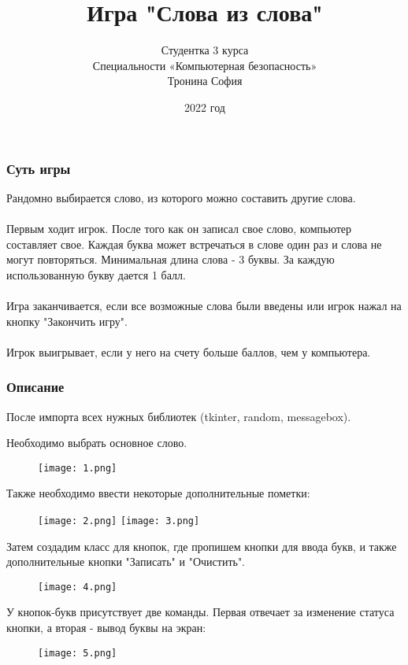 \documentclass[10pt,pdf,hyperref={unicode}]{beamer}
\title{Игра "Слова из слова"}
\author{Студентка 3 курса\\Специальности «Компьютерная безопасность»\\Тронина София}
\date{2022 год}
\newcommand{\jj}{\righthyphenmin=20 \justifying}
\begin{document}
	
	\begin{frame}
		\titlepage
	\end{frame} 
	
   	\begin{frame}
		\frametitle{Суть игры}
		\jj
		Рандомно выбирается слово, из которого можно составить другие слова. \\
		~\\Первым ходит игрок. После того как он записал свое слово, компьютер составляет свое. Каждая буква может встречаться в слове один раз и слова не могут повторяться. Минимальная длина слова - 3 буквы. За каждую использованную букву дается 1 балл. \\
		~\\Игра заканчивается, если все возможные слова были введены или игрок нажал на кнопку "Закончить игру". \\
		~\\Игрок выигрывает, если у него на счету больше баллов, чем у компьютера.
	\end{frame}

	\begin{frame}
		\frametitle{Описание}
		\jj
		После импорта всех нужных библиотек (tkinter, random, messagebox). 
		
		Необходимо выбрать основное слово.
		\begin{figure}[h]
			\texttt{[image: 1.png]}
			\label{fig:mpr}
		\end{figure}
		\jj
		Также необходимо ввести некоторые дополнительные пометки:
		\begin{figure}[h]
			\texttt{[image: 2.png]}
			\texttt{[image: 3.png]}
		\end{figure}
	\end{frame}

	\begin{frame}
		\jj
		Затем создадим класс для кнопок, где пропишем кнопки для ввода букв, и также дополнительные кнопки "Записать" и "Очистить". 
		\begin{figure}[h]
			\texttt{[image: 4.png]}
		\end{figure}
		\jj
		У кнопок-букв присутствует две команды. Первая отвечает за изменение статуса кнопки, а вторая - вывод буквы на экран:
		\begin{figure}[h]
			\texttt{[image: 5.png]}
		\end{figure}
	\end{frame}
	
\end{document}

